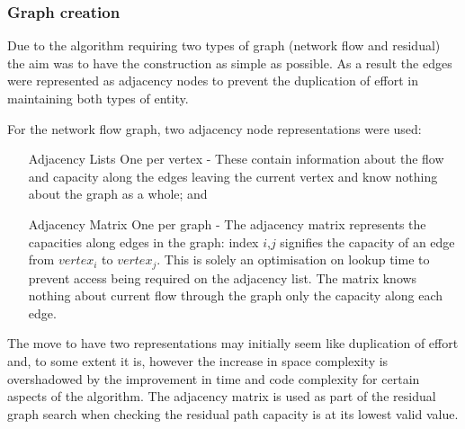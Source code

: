 \subsubsection{Graph creation}

Due to the algorithm requiring two types of graph (network flow and residual)
the aim was to have the construction as simple as possible. As a result the
edges were represented as adjacency nodes to prevent the duplication of effort
in maintaining both types of entity.

For the network flow graph, two adjacency node representations were
used:
\begin{itemize}
\item[Adjacency Lists] One per vertex - These contain information
  about the flow and capacity along the edges leaving the current
  vertex and know nothing about the graph as a whole; and  
\item[Adjacency Matrix] One per graph - The adjacency matrix
  represents the capacities along edges in the graph: index $i$,$j$
  signifies the capacity of an edge from $vertex_i$ to
  $vertex_j$. This is solely an optimisation on lookup time to prevent
  access being required on the adjacency list. The matrix knows
  nothing about current flow through the graph only the capacity along
  each edge.
\end{itemize}

The move to have two representations may initially seem
like duplication of effort and, to some extent it is, however the increase in
space complexity is overshadowed by the improvement in time and code complexity
for certain aspects of the algorithm. The adjacency matrix is used as part of
the residual graph search when checking the residual path capacity is at its
lowest valid value.
